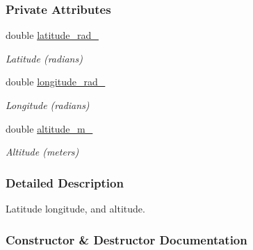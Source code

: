 \subsubsection*{Private Attributes}
\begin{DoxyCompactItemize}
\item 
\mbox{\label{classosse_1_1collaborate_1_1_geodetic_ab37875cea23c8e39892ee87c8c42c83a}} 
double \hyperlink{classosse_1_1collaborate_1_1_geodetic_ab37875cea23c8e39892ee87c8c42c83a}{latitude\+\_\+rad\+\_\+}
\begin{DoxyCompactList}\small\item\em Latitude (radians) \end{DoxyCompactList}\item 
\mbox{\label{classosse_1_1collaborate_1_1_geodetic_a86223073ca9f7d9c7e0bc3594f412b1f}} 
double \hyperlink{classosse_1_1collaborate_1_1_geodetic_a86223073ca9f7d9c7e0bc3594f412b1f}{longitude\+\_\+rad\+\_\+}
\begin{DoxyCompactList}\small\item\em Longitude (radians) \end{DoxyCompactList}\item 
\mbox{\label{classosse_1_1collaborate_1_1_geodetic_a72989a52edbfd0ae45d5c29637852733}} 
double \hyperlink{classosse_1_1collaborate_1_1_geodetic_a72989a52edbfd0ae45d5c29637852733}{altitude\+\_\+m\+\_\+}
\begin{DoxyCompactList}\small\item\em Altitude (meters) \end{DoxyCompactList}\end{DoxyCompactItemize}


\subsubsection{Detailed Description}
Latitude longitude, and altitude. 

\subsubsection{Constructor \& Destructor Documentation}
\mbox{\label{classosse_1_1collaborate_1_1_geodetic_ac9d280c2db61a43f05581513d33ed592}} 
